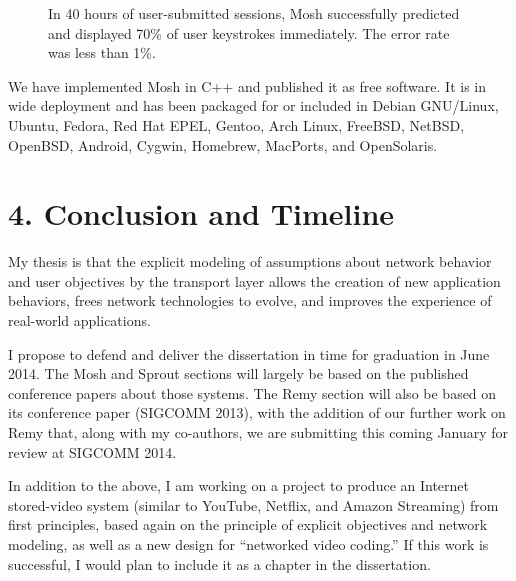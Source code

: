 \documentclass{article}
\begin{document}
\begin{figure}
\begin{centering}
\def\svgwidth{8 cm}\footnotesize
\caption{In 40 hours of user-submitted sessions, Mosh successfully
  predicted and displayed 70\% of user keystrokes immediately. The error rate was less than 1\%.}
\label{f:moshcdfs}
\end{centering}
\end{figure}

We have implemented Mosh in C++ and published it as free software. It
is in wide deployment and has been packaged for or included in Debian
GNU/Linux, Ubuntu, Fedora, Red Hat EPEL, Gentoo, Arch Linux, FreeBSD,
NetBSD, OpenBSD, Android, Cygwin, Homebrew, MacPorts, and OpenSolaris.

\section*{4. Conclusion and Timeline}

My thesis is that the explicit modeling of assumptions about network
behavior and user objectives by the transport layer allows the
creation of new application behaviors, frees network technologies to
evolve, and improves the experience of real-world applications.

I propose to defend and deliver the dissertation in time for
graduation in June 2014. The Mosh and Sprout sections will largely
be based on the published conference papers about those systems. The Remy
section will also be based on its conference paper (SIGCOMM 2013),
with the addition of our further work on Remy that, along with my
co-authors, we are submitting this coming January for review at
SIGCOMM 2014.

In addition to the above, I am working on a project to produce an
Internet stored-video system (similar to YouTube, Netflix, and Amazon
Streaming) from first principles, based again on the principle of
explicit objectives and network modeling, as well as a new design for
``networked video coding.'' If this work is successful, I would plan to
include it as a chapter in the dissertation.
\end{document}
